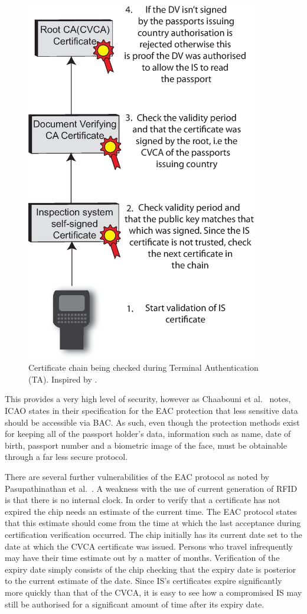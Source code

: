 \documentclass[12pt]{article}
\begin{document}
\begin{figure}
\centering
\includegraphics[width=4in]{Certificate-Chain.eps}
\caption{Certificate chain being checked during Terminal Authentication (TA). Inspired by \cite{OracleCertificateC:wr}.}
\label{fig:cert-chain}
\end{figure}

This provides a very high level of security, however as Chaabouni et al.\ \cite{Chaabouni:2008wb} notes, ICAO states in their specification for the EAC protection that less sensitive data should be accessible via BAC. As such, even though the protection methods exist for keeping all of the passport holder's data, information such as name, date of birth, passport number and a biometric image of the face, must be obtainable through a far less secure protocol. 

There are several further vulnerabilities of the EAC protocol as noted by Pasupathinathan et al.\ \cite{Pasupathinathan:2008vy}. A weakness with the use of current generation of RFID is that there is no internal clock. In order to verify that a certificate has not expired the chip needs an estimate of the current time. The EAC protocol states that this estimate should come from the time at which the last acceptance during certification verification occurred. The chip initially has its current date set to the date at which the CVCA certificate was issued. Persons who travel infrequently may have their time estimate out by a matter of months. Verification of the expiry date simply consists of the chip checking that the expiry date is posterior to the current estimate of the date. 
Since IS's certificates expire significantly more quickly than that of the CVCA, it is easy to see how a compromised IS may still be authorised for a significant amount of time after its expiry date.
\end{document}
